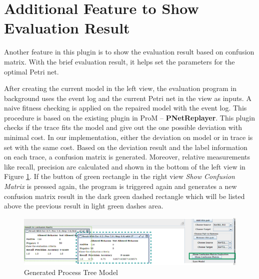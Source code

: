 \section{Additional Feature to Show Evaluation Result}
Another feature in this plugin  is to show the evaluation result based on confusion matrix. With the brief evaluation result, it helps set the parameters for the optimal Petri net. 

After creating the current model in the left view, the evaluation program in background uses the event log and the current Petri net in the view as inputs. A naive fitness checking is applied on the repaired model with the event log. This procedure is based on the existing plugin in ProM -- \textbf{PNetReplayer}. This plugin checks if the trace fits the model and give out the one possible deviation with minimal cost. In our implementation, either the deviation on model or in trace is set with the same cost. Based on the deviation result and the label information on each trace, a confusion matrix is generated. Moreover, relative measurements like recall, precision are calculated and shown in the bottom of the left view in Figure \ref{fig:dfg-IM-cm}.  If the button of green rectangle in the right view \emph{Show Confusion Matrix} is pressed again, the program is triggered again and generates a new  confusion matrix result in the dark green dashed rectangle which will be listed above the previous result in light green dashes area. 
\begin{figure}
	\centering
	\includegraphics[width=\textwidth]{figures/implementation/dfg-IM-confusionmatrix.png}
	\caption{Generated Process Tree Model}
	\label{fig:dfg-IM-cm}
\end{figure}

